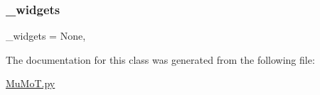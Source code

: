 \subsubsection{\texorpdfstring{\+\_\+widgets}{\_widgets}}
{\footnotesize\ttfamily \+\_\+widgets = None\hspace{0.3cm}{\ttfamily [static]}, {\ttfamily [private]}}



The documentation for this class was generated from the following file\+:\begin{DoxyCompactItemize}
\item 
\hyperlink{_mu_mo_t_8py}{Mu\+Mo\+T.\+py}\end{DoxyCompactItemize}
